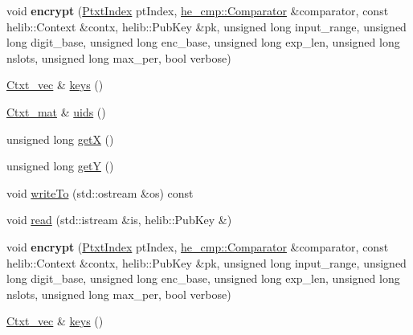 \begin{DoxyCompactItemize}
\item 
\mbox{\label{classHDB__supergate___1_1CtxtIndex_a6ace7831c4e9481a6d3e4c3a7af2c680}} 
void {\bfseries encrypt} (\hyperlink{classHDB__supergate___1_1PtxtIndex}{Ptxt\+Index} pt\+Index, \hyperlink{classhe__cmp_1_1Comparator}{he\+\_\+cmp\+::\+Comparator} \&comparator, const helib\+::\+Context \&contx, helib\+::\+Pub\+Key \&pk, unsigned long input\+\_\+range, unsigned long digit\+\_\+base, unsigned long enc\+\_\+base, unsigned long exp\+\_\+len, unsigned long nslots, unsigned long max\+\_\+per, bool verbose)
\item 
\hyperlink{namespaceHDB__supergate___ade0781b5973aae08b689ed72b30511fb}{Ctxt\+\_\+vec} \& \hyperlink{classHDB__supergate___1_1CtxtIndex_aab60ebde906ebfbf292fcc301168a54a}{keys} ()
\item 
\hyperlink{namespaceHDB__supergate___a46a3fb2b98c95dc7615203376c4ad0c8}{Ctxt\+\_\+mat} \& \hyperlink{classHDB__supergate___1_1CtxtIndex_a928f500292b531aac98d86fb4e3511ec}{uids} ()
\item 
unsigned long \hyperlink{classHDB__supergate___1_1CtxtIndex_ad3ee6eaf8a48319e153f30a6914dc6a9}{getX} ()
\item 
unsigned long \hyperlink{classHDB__supergate___1_1CtxtIndex_a1982acce75987d7a292341d5af81f1fd}{getY} ()
\item 
void \hyperlink{classHDB__supergate___1_1CtxtIndex_a8766dc2600531ae78e8434df581eb42d}{write\+To} (std\+::ostream \&os) const
\item 
void \hyperlink{classHDB__supergate___1_1CtxtIndex_a07894a32a19b27cae1f189dc74353565}{read} (std\+::istream \&is, helib\+::\+Pub\+Key \&)
\item 
\mbox{\label{classHDB__supergate___1_1CtxtIndex_a6ace7831c4e9481a6d3e4c3a7af2c680}} 
void {\bfseries encrypt} (\hyperlink{classHDB__supergate___1_1PtxtIndex}{Ptxt\+Index} pt\+Index, \hyperlink{classhe__cmp_1_1Comparator}{he\+\_\+cmp\+::\+Comparator} \&comparator, const helib\+::\+Context \&contx, helib\+::\+Pub\+Key \&pk, unsigned long input\+\_\+range, unsigned long digit\+\_\+base, unsigned long enc\+\_\+base, unsigned long exp\+\_\+len, unsigned long nslots, unsigned long max\+\_\+per, bool verbose)
\item 
\hyperlink{namespaceHDB__supergate___ade0781b5973aae08b689ed72b30511fb}{Ctxt\+\_\+vec} \& \hyperlink{classHDB__supergate___1_1CtxtIndex_aab60ebde906ebfbf292fcc301168a54a}{keys} ()

\end{DoxyCompactItemize}
